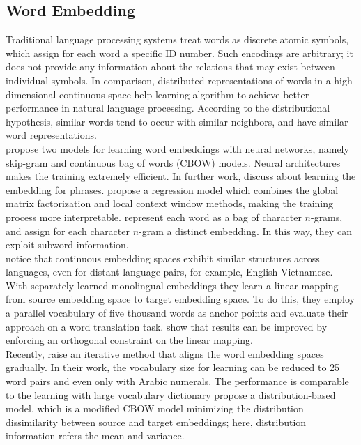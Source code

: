 \subsection{Word Embedding}
\indent Traditional language processing systems treat words as discrete atomic symbols, which assign for each word a specific ID number. Such encodings are arbitrary; it does not provide any information about the relations that may exist between individual symbols. In comparison, distributed representations of words in a high dimensional continuous space help learning algorithm to achieve better performance in natural language processing. According to the distributional hypothesis, similar words tend to occur with similar neighbors, and have similar word representations. \\
\cite{mikolov2013efficient} propose two models for learning word embeddings with neural networks, namely skip-gram and continuous bag of words (CBOW) models. Neural architectures makes the training extremely efficient. In further work, \cite{mikolov2013distributed} discuss about learning the embedding for phrases. \cite{pennington2014glove} propose a regression model which combines the global matrix factorization and local context window methods, making the training process more interpretable. \cite{DBLP:journals/corr/BojanowskiGJM16} represent each word as a bag of character $n$-grams, and assign for each character $n$-gram a distinct embedding. In this way, they can exploit subword information. \\
\cite{mikolov2013exploiting} notice that continuous embedding spaces exhibit similar structures across languages, even for distant language pairs, for example, English-Vietnamese.  With separately learned monolingual embeddings they learn a linear mapping from source embedding space to target embedding space. To do this, they employ a parallel vocabulary of five thousand words as anchor points and evaluate their approach on a word translation task. \cite{xing2015normalized} show that results can be improved by enforcing an orthogonal constraint on the linear mapping. \\
Recently, \cite{artetxe2017learning} raise an iterative method that aligns the word embedding spaces gradually. In their work, the vocabulary size for learning can be reduced to 25 word pairs and even only with Arabic numerals. The performance is comparable to the learning with large vocabulary dictionary \cite{cao2016distribution} propose a distribution-based model, which is a modified CBOW model minimizing the distribution dissimilarity between source and target embeddings; here, distribution information refers the mean and variance. 

